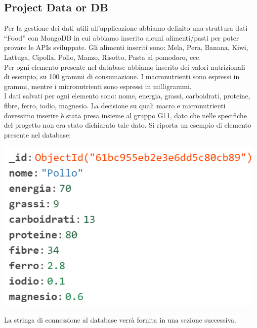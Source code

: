 \documentclass{article}
\begin{document}
   \subsection{Project Data or DB}
   Per la gestione dei dati utili all’applicazione abbiamo definito una struttura dati “Food” con MongoDB in cui abbiamo inserito alcuni alimenti/pasti per poter provare le APIs sviluppate.
   Gli alimenti inseriti sono: Mela, Pera, Banana, Kiwi, Lattuga, Cipolla, Pollo, Manzo, Risotto, Pasta al pomodoro, ecc.\\
   Per ogni elemento presente nel database abbiamo inserito dei valori nutrizionali di esempio, su 100 grammi di consumazione. I macronutrienti sono espressi in grammi, mentre i micronutrienti sono espressi in milligrammi.\\
   I dati salvati per ogni elemento sono: nome, energia, grassi, carboidrati, proteine, fibre, ferro, iodio, magnesio.
   La decisione su quali macro e micronutrienti dovessimo inserire è stata presa insieme al gruppo G11, dato che nelle specifiche del progetto non era stato dichiarato tale dato.
   Si riporta un esempio di elemento presente nel database:\\
   \begin{center}
      \includegraphics[scale=0.5]{pollo.png}
   \end{center}
   La stringa di connessione al database verrà fornita in una sezione successiva.
\end{document}
